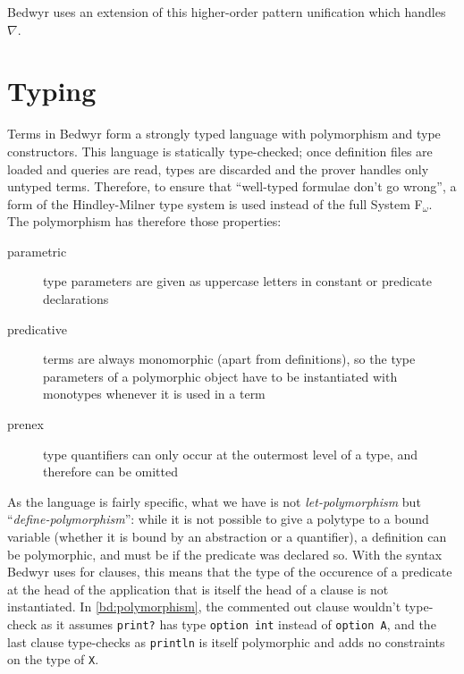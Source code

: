 Bedwyr uses an extension of this higher-order pattern unification which
handles $\nabla$.


\section{Typing}
\label{typing}

Terms in Bedwyr form a strongly typed language with polymorphism and
type constructors.  This language is statically type-checked; once
definition files are loaded and queries are read, types are discarded
and the prover handles only untyped terms.  Therefore, to ensure that
``well-typed formulae don't go wrong'', a form of the Hindley-Milner
type system is used instead of the full System F$_\omega$.  The
polymorphism has therefore those properties:
\begin{description}
  \item[parametric] type parameters are given as uppercase letters in
    constant or predicate declarations

  \item[predicative] terms are always monomorphic (apart from
    definitions), so the type parameters of a polymorphic object have to
    be instantiated with monotypes whenever it is used in a term

  \item[prenex] type quantifiers can only occur at the outermost level
    of a type, and therefore can be omitted
\end{description}

As the language is fairly specific, what we have is not
\emph{let-polymorphism} but ``\emph{define-polymorphism}'': while it is
not possible to give a polytype to a bound variable (whether it is bound
by an abstraction or a quantifier), a definition can be polymorphic, and
must be if the predicate was declared so.  With the syntax Bedwyr uses
for clauses, this means that the type of the occurence of a predicate at
the head of the application that is itself the head of a clause is not
instantiated.  In \autoref{bd:polymorphism}, the commented out clause
wouldn't type-check as it assumes \lstinline{print?} has type
\lstinline{option int} instead of \lstinline{option A}, and the last
clause type-checks as \lstinline{println} is itself polymorphic and adds
no constraints on the type of \lstinline{X}.


